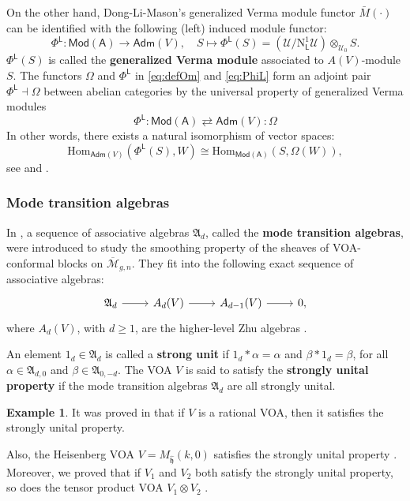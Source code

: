 \documentclass[12pt,a4paper,reqno]{amsart}
\numberwithin{equation}{section}
\numberwithin{equation}{section}
\theoremstyle{definition}
\newtheorem{example}[thm]{Example}
\def \ra {\rightarrow}
\def \al{\alpha}
\def \b {\beta}
\def \h {\mathfrak{h}}
\def \Hom {\mathrm{Hom}}
\def\L{\mathcal{L}}
\def\o{\otimes}
\def\Om{\Omega}
\def\scrU{\mathscr{U}}
\def\rN{\mathrm{N}}
\def\L{\mathsf{L}}
\def\fA{\mathfrak{A}}
\def\rN{\mathrm{N}}
\def\L{\mathsf{L}}
\def\A{\mathsf{A}}
\begin{document}
	On the other hand, Dong-Li-Mason's generalized Verma module functor $\bar{M}(\cdot)$ \cite[Theorem 6.2]{DLM1} can be identified with the following (left) induced module functor:
	\begin{equation}\label{eq:PhiL}
		\Phi^\L:  \mathsf{Mod}(\A)\ra  \mathsf{Adm}(V),\quad S\mapsto \Phi^\L(S)=(\scrU/	\rN^1_\L \scrU)\o _{\scrU_0} S. 
	\end{equation}
$\Phi^\L(S)$ is called the {\bf generalized Verma module} associated to $A(V)$-module $S$. 	
	The functors $\Om$ and $\Phi^\L$ in \eqref{eq:defOm} and \eqref{eq:PhiL} form an adjoint pair $\Phi^\L\dashv \Om$ between abelian categories by the universal property of generalized Verma modules
	\begin{equation}\label{eq:adjointfunctor}
		\Phi^\L:\mathsf{Mod}(\A)\rightleftarrows\mathsf{Adm}(V):\Om
	\end{equation}
	In other words, there exists a natural isomorphism of vector spaces:
	$$
	\Hom_{\mathsf{Adm}(V)}(\Phi^\L(S),W)\cong \Hom_{\mathsf{Mod}(\A)}(S,\Om(W)),
	$$
	see \cite[Theorem 6.2]{DLM1} and \cite[Proposition 3.1.2]{DGK23}. 
	
\subsubsection{Mode transition algebras}
	In \cite{DGK23}, a sequence of associative algebras $\fA_d$, called the {\bf mode transition algebras}, were introduced to study the smoothing property of the sheaves of VOA-conformal blocks on $\overline{\mathcal{M}}_{g,n}$. They fit into the following exact sequence of associative algebras:
	$$
	\begin{tikzcd}
	\fA_d\arrow[r] &A_d(V)\arrow[r] &A_{d-1}(V)\arrow[r]& 0,
	\end{tikzcd}
	$$
	where $A_d(V)$, with $d\geq 1$, are the higher-level Zhu algebras \cite{DLM2}. 
	
An element 	$1_d\in \fA_d$ is called a {\bf strong unit} if $1_d\ast \al=\al$ and $\b\ast 1_d=\b$, for all $\al\in \fA_{d,0}$ and $\b\in \fA_{0,-d}$. The VOA $V$ is said to satisfy the {\bf strongly unital property} if the mode transition algebras $\fA_d$ are all strongly unital. 

\begin{example}
	It was proved in \cite{DGK23} that if $V$ is a rational VOA, then it satisfies the strongly unital property.
	
Also, the Heisenberg VOA $V=M_{\hat{\h}}(k,0)$ satisfies the strongly unital property  \cite{DGK23,DGK2}. Moreover, we proved that if $V_1$ and $V_2$ both satisfy the strongly unital property, so does the tensor product VOA $V_1\o V_2$ \cite{GGKL25,LS25}. 
\end{example}	
\end{document}
